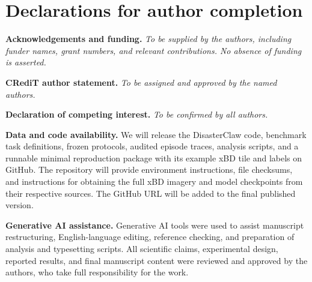 \section*{Declarations for author completion}
\noindent\textbf{Acknowledgements and funding.} \textit{To be supplied by the authors, including funder names, grant numbers, and relevant contributions. No absence of funding is asserted.}

\smallskip\noindent\textbf{CRediT author statement.} \textit{To be assigned and approved by the named authors.}

\smallskip\noindent\textbf{Declaration of competing interest.} \textit{To be confirmed by all authors.}

\smallskip\noindent\textbf{Data and code availability.} We will release the DisasterClaw code, benchmark task definitions, frozen protocols, audited episode traces, analysis scripts, and a runnable minimal reproduction package with its example xBD tile and labels on GitHub. The repository will provide environment instructions, file checksums, and instructions for obtaining the full xBD imagery and model checkpoints from their respective sources. The GitHub URL will be added to the final published version.

\smallskip\noindent\textbf{Generative AI assistance.} Generative AI tools were used to assist manuscript restructuring, English-language editing, reference checking, and preparation of analysis and typesetting scripts. All scientific claims, experimental design, reported results, and final manuscript content were reviewed and approved by the authors, who take full responsibility for the work.
